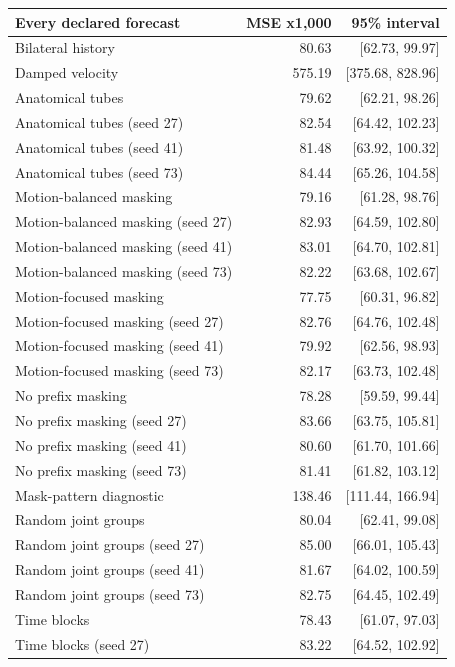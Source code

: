 \documentclass[letterpaper]{article}
\begin{document}
\begin{table}[t]
\centering
\footnotesize
\begin{tabular}{lrr}
\toprule
Every declared forecast & MSE x1,000 & 95\% interval \\
\midrule
Bilateral history & 80.63 & [62.73, 99.97] \\
Damped velocity & 575.19 & [375.68, 828.96] \\
Anatomical tubes & 79.62 & [62.21, 98.26] \\
Anatomical tubes (seed 27) & 82.54 & [64.42, 102.23] \\
Anatomical tubes (seed 41) & 81.48 & [63.92, 100.32] \\
Anatomical tubes (seed 73) & 84.44 & [65.26, 104.58] \\
Motion-balanced masking & 79.16 & [61.28, 98.76] \\
Motion-balanced masking (seed 27) & 82.93 & [64.59, 102.80] \\
Motion-balanced masking (seed 41) & 83.01 & [64.70, 102.81] \\
Motion-balanced masking (seed 73) & 82.22 & [63.68, 102.67] \\
Motion-focused masking & 77.75 & [60.31, 96.82] \\
Motion-focused masking (seed 27) & 82.76 & [64.76, 102.48] \\
Motion-focused masking (seed 41) & 79.92 & [62.56, 98.93] \\
Motion-focused masking (seed 73) & 82.17 & [63.73, 102.48] \\
No prefix masking & 78.28 & [59.59, 99.44] \\
No prefix masking (seed 27) & 83.66 & [63.75, 105.81] \\
No prefix masking (seed 41) & 80.60 & [61.70, 101.66] \\
No prefix masking (seed 73) & 81.41 & [61.82, 103.12] \\
Mask-pattern diagnostic & 138.46 & [111.44, 166.94] \\
Random joint groups & 80.04 & [62.41, 99.08] \\
Random joint groups (seed 27) & 85.00 & [66.01, 105.43] \\
Random joint groups (seed 41) & 81.67 & [64.02, 100.59] \\
Random joint groups (seed 73) & 82.75 & [64.45, 102.49] \\
Time blocks & 78.43 & [61.07, 97.03] \\
Time blocks (seed 27) & 83.22 & [64.52, 102.92] \\

\end{tabular}
\end{table}
\end{document}
